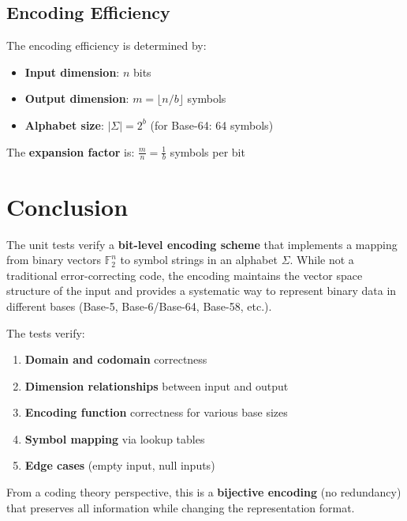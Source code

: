 \documentclass[11pt,a4paper]{article}
\begin{document}
\subsection{Encoding Efficiency}

The encoding efficiency is determined by:
\begin{itemize}
\item \textbf{Input dimension}: $n$ bits
\item \textbf{Output dimension}: $m = \lfloor n/b \rfloor$ symbols
\item \textbf{Alphabet size}: $|\Sigma| = 2^b$ (for Base-64: 64 symbols)
\end{itemize}

The \textbf{expansion factor} is: $\frac{m}{n} = \frac{1}{b}$ symbols per bit

\section{Conclusion}

The unit tests verify a \textbf{bit-level encoding scheme} that implements a mapping from binary vectors $\mathbb{F}_2^n$ to symbol strings in an alphabet $\Sigma$. While not a traditional error-correcting code, the encoding maintains the vector space structure of the input and provides a systematic way to represent binary data in different bases (Base-5, Base-6/Base-64, Base-58, etc.).

The tests verify:
\begin{enumerate}
\item \textbf{Domain and codomain} correctness
\item \textbf{Dimension relationships} between input and output
\item \textbf{Encoding function} correctness for various base sizes
\item \textbf{Symbol mapping} via lookup tables
\item \textbf{Edge cases} (empty input, null inputs)
\end{enumerate}

From a coding theory perspective, this is a \textbf{bijective encoding} (no redundancy) that preserves all information while changing the representation format.
\end{document}
